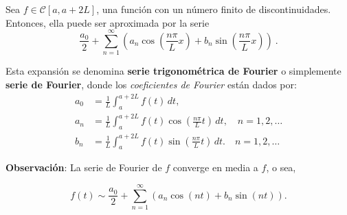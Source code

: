 \begin{defi}
Sea $f \in \mathscr{C}[a, a+2L]$, una función con un número finito de discontinuidades. Entonces, ella puede ser aproximada por la serie 
\begin{equation}
    \frac{a_0}{2} + \sum_{n=1}^{\infty} ( a_n \cos\left( \frac{n\pi}{L}x \right) + b_n \sin\left( \frac{n\pi}{L}x \right)) \ . \label{FourierTrigo}
\end{equation}

Esta expansión se denomina \textbf{serie trigonométrica de Fourier} o simplemente \textbf{serie de Fourier}, donde los \textit{coeficientes de Fourier} están dados por:
\begin{align*}
    a_0 &= \frac{1}{L} \int_{a}^{a+2L} f(t) \,dt, \\
    a_n &= \frac{1}{L} \int_{a}^{a+2L} f(t) \cos\left( \frac{n\pi}{L}t \right) \,dt, \quad n = 1,2, \dots\\
    b_n &= \frac{1}{L} \int_{a}^{a+2L} f(t) \sin\left( \frac{n\pi}{L}t \right) \,dt. \quad n = 1,2, \dots
\end{align*}
\end{defi}

\textbf{Observación}: La serie de Fourier de $f$ converge en media a $f$, o sea, 
\begin{shaded}
$$f(t) \sim \frac{a_0}{2} + \sum_{n=1}^{\infty} (a_n \cos(nt) + b_n \sin(nt)).$$    
\end{shaded}





